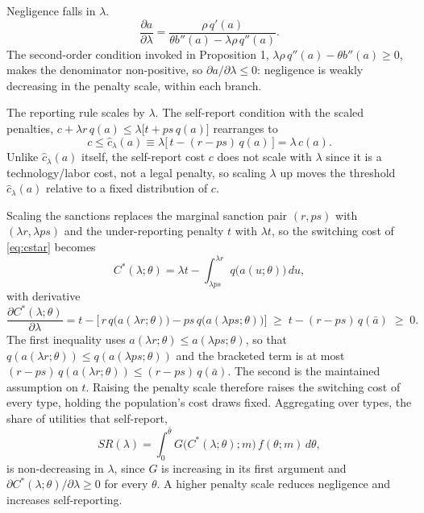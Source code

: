 \documentclass[12pt]{article}
\begin{document}
	Negligence falls in $\lambda$.
	\[
	\frac{\partial a}{\partial \lambda} = \frac{\rho\,q'(a)}{\theta b''(a) - \lambda \rho\, q''(a)}.
	\]
	The second-order condition invoked in Proposition 1, $\lambda \rho\,q''(a) - \theta b''(a) \ge 0$, makes the denominator non-positive, so $\partial a/\partial\lambda \le 0$: negligence is weakly decreasing in the penalty scale, within each branch.
	
	The reporting rule scales by $\lambda$. The self-report condition with the scaled penalties, $c + \lambda r\,q(a) \le \lambda\big[t+ps\,q(a)\big]$ rearranges to
	\begin{equation}\label{eq:chat_lambda}
		c \le \hat{c}_\lambda(a) \equiv \lambda\big[\,t - (r-ps)\,q(a)\,\big] = \lambda\,\hat{c}(a).
	\end{equation}
	Unlike $\hat{c}_\lambda(a)$ itself, the self-report cost $c$ does not scale with $\lambda$ since it is a technology/labor cost, not a legal penalty, so scaling $\lambda$ up moves the threshold $\hat{c}_\lambda(a)$ relative to a fixed distribution of $c$.
	
	Scaling the sanctions replaces the marginal sanction pair $(r, ps)$ with $(\lambda r, \lambda ps)$ and the under-reporting penalty $t$ with $\lambda t$, so the switching cost of \eqref{eq:cstar} becomes
	\[
	C^*(\lambda;\theta) = \lambda t - \int_{\lambda ps}^{\lambda r} q\big(a(u;\theta)\big)\, du,
	\]
	with derivative
	\[
	\frac{\partial C^*(\lambda;\theta)}{\partial \lambda} = t - \Big[\, r\, q\big(a(\lambda r;\theta)\big) - ps\, q\big(a(\lambda ps;\theta)\big) \Big] \;\ge\; t - (r-ps)\, q(\bar{a}) \;\ge\; 0.
	\]
	The first inequality uses $a(\lambda r;\theta) \le a(\lambda ps;\theta)$, so that $q(a(\lambda r;\theta)) \le q(a(\lambda ps;\theta))$ and the bracketed term is at most $(r-ps)\,q(a(\lambda r;\theta)) \le (r-ps)\,q(\bar{a})$. The second is the maintained assumption on $t$. Raising the penalty scale therefore raises the switching cost of every type, holding the population's cost draws fixed. Aggregating over types, the share of utilities that self-report,
	\[
	SR(\lambda) = \int_0^{\bar\theta} G\big(C^*(\lambda;\theta);m\big)\, f(\theta;m)\, d\theta,
	\]
	is non-decreasing in $\lambda$, since $G$ is increasing in its first argument and $\partial C^*(\lambda;\theta)/\partial\lambda \ge 0$ for every $\theta$. A higher penalty scale reduces negligence and increases self-reporting.


\newpage

\end{document}
